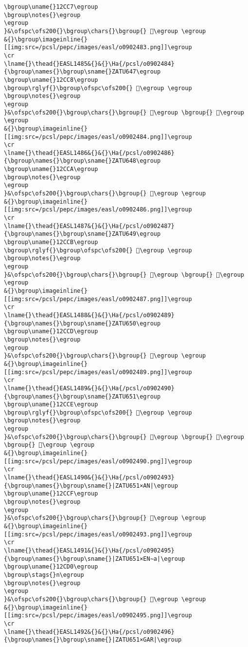 \begin{verbatim}
\bgroup\uname{}12CC7\egroup
\bgroup\notes{}\egroup
\egroup
}&\ofspc\ofs200{}\bgroup\chars{}\bgroup{} 𒳇\egroup \egroup
&{}\bgroup\imageinline{}[[img:src=/pcsl/pepc/images/easl/o0902483.png]]\egroup
\cr
\lname{}\thead{}EASL1485&{}&{}\Ha{/pcsl/o0902484}{\bgroup\names{}\bgroup\sname{}ZATU647\egroup
\bgroup\uname{}12CC8\egroup
\bgroup\rglyf{}\bgroup\ofspc\ofs200{} 𒳈\egroup \egroup
\bgroup\notes{}\egroup
\egroup
}&\ofspc\ofs200{}\bgroup\chars{}\bgroup{} 𒳈\egroup \bgroup{} 𒳉\egroup \egroup
&{}\bgroup\imageinline{}[[img:src=/pcsl/pepc/images/easl/o0902484.png]]\egroup
\cr
\lname{}\thead{}EASL1486&{}&{}\Ha{/pcsl/o0902486}{\bgroup\names{}\bgroup\sname{}ZATU648\egroup
\bgroup\uname{}12CCA\egroup
\bgroup\notes{}\egroup
\egroup
}&\ofspc\ofs200{}\bgroup\chars{}\bgroup{} 𒳊\egroup \egroup
&{}\bgroup\imageinline{}[[img:src=/pcsl/pepc/images/easl/o0902486.png]]\egroup
\cr
\lname{}\thead{}EASL1487&{}&{}\Ha{/pcsl/o0902487}{\bgroup\names{}\bgroup\sname{}ZATU649\egroup
\bgroup\uname{}12CCB\egroup
\bgroup\rglyf{}\bgroup\ofspc\ofs200{} 𒳋\egroup \egroup
\bgroup\notes{}\egroup
\egroup
}&\ofspc\ofs200{}\bgroup\chars{}\bgroup{} 𒳋\egroup \bgroup{} 𒳌\egroup \egroup
&{}\bgroup\imageinline{}[[img:src=/pcsl/pepc/images/easl/o0902487.png]]\egroup
\cr
\lname{}\thead{}EASL1488&{}&{}\Ha{/pcsl/o0902489}{\bgroup\names{}\bgroup\sname{}ZATU650\egroup
\bgroup\uname{}12CCD\egroup
\bgroup\notes{}\egroup
\egroup
}&\ofspc\ofs200{}\bgroup\chars{}\bgroup{} 𒳍\egroup \egroup
&{}\bgroup\imageinline{}[[img:src=/pcsl/pepc/images/easl/o0902489.png]]\egroup
\cr
\lname{}\thead{}EASL1489&{}&{}\Ha{/pcsl/o0902490}{\bgroup\names{}\bgroup\sname{}ZATU651\egroup
\bgroup\uname{}12CCE\egroup
\bgroup\rglyf{}\bgroup\ofspc\ofs200{} 𒳎\egroup \egroup
\bgroup\notes{}\egroup
\egroup
}&\ofspc\ofs200{}\bgroup\chars{}\bgroup{} 𒳘\egroup \bgroup{} 𒳗\egroup \bgroup{} 𒳎\egroup \egroup
&{}\bgroup\imageinline{}[[img:src=/pcsl/pepc/images/easl/o0902490.png]]\egroup
\cr
\lname{}\thead{}EASL1490&{}&{}\Ha{/pcsl/o0902493}{\bgroup\names{}\bgroup\sname{}|ZATU651×AN|\egroup
\bgroup\uname{}12CCF\egroup
\bgroup\notes{}\egroup
\egroup
}&\ofspc\ofs200{}\bgroup\chars{}\bgroup{} 𒳏\egroup \egroup
&{}\bgroup\imageinline{}[[img:src=/pcsl/pepc/images/easl/o0902493.png]]\egroup
\cr
\lname{}\thead{}EASL1491&{}&{}\Ha{/pcsl/o0902495}{\bgroup\names{}\bgroup\sname{}|ZATU651×EN∼a|\egroup
\bgroup\uname{}12CD0\egroup
\bgroup\stags{}n\egroup
\bgroup\notes{}\egroup
\egroup
}&\ofspc\ofs200{}\bgroup\chars{}\bgroup{} 𒳐\egroup \egroup
&{}\bgroup\imageinline{}[[img:src=/pcsl/pepc/images/easl/o0902495.png]]\egroup
\cr
\lname{}\thead{}EASL1492&{}&{}\Ha{/pcsl/o0902496}{\bgroup\names{}\bgroup\sname{}|ZATU651×GAR|\egroup

\end{verbatim}
